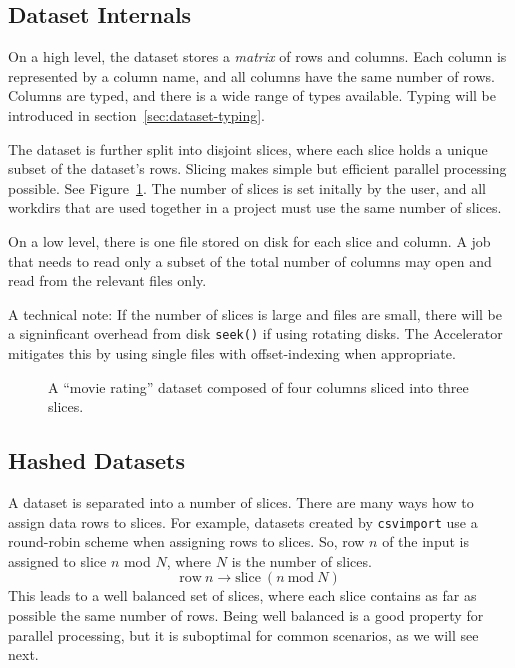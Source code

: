 \documentclass[a4paper]{article}
\begin{document}
\subsection{Dataset Internals}

On a high level, the dataset stores a \textsl{matrix} of rows and
columns.  Each column is represented by a column name, and all columns
have the same number of rows.  Columns are typed, and there is a wide
range of types available.  Typing will be introduced in
section~\ref{sec:dataset-typing}.

The dataset is further split into disjoint slices, where each slice
holds a unique subset of the dataset's rows.  Slicing makes simple but
efficient parallel processing possible.  See Figure~\ref{fig:slices}.
The number of slices is set initally by the user, and all workdirs
that are used together in a project must use the same number of
slices.

On a low level, there is one file stored on disk for each slice and
column.  A job that needs to read only a subset of the total number of
columns may open and read from the relevant files only.

A technical note: If the number of slices is large and files are
small, there will be a signinficant overhead from disk \texttt{seek()}
if using rotating disks.  The Accelerator mitigates this by using
single files with offset-indexing when appropriate.


\begin{figure}[h!]
  \begin{center}
    
    \caption{A ``movie rating'' dataset composed of four columns
      sliced into three slices.}
    \label{fig:slices}
  \end{center}
\end{figure}

\clearpage

\subsection{Hashed Datasets}

A dataset is separated into a number of slices.  There are many ways
how to assign data rows to slices.  For example, datasets created by
\texttt{csvimport} use a round-robin scheme when assigning rows to
slices.  So, row $n$ of the input is assigned to slice $n$ mod $N$,
where $N$ is the number of slices.
\begin{equation}
  \textrm{row}~n \longrightarrow \textrm{slice}~(n~\textrm{mod}~N)
\end{equation}
This leads to a well balanced set of slices, where each slice contains
as far as possible the same number of rows.  Being well balanced is a
good property for parallel processing, but it is suboptimal for common
scenarios, as we will see next.
\end{document}
